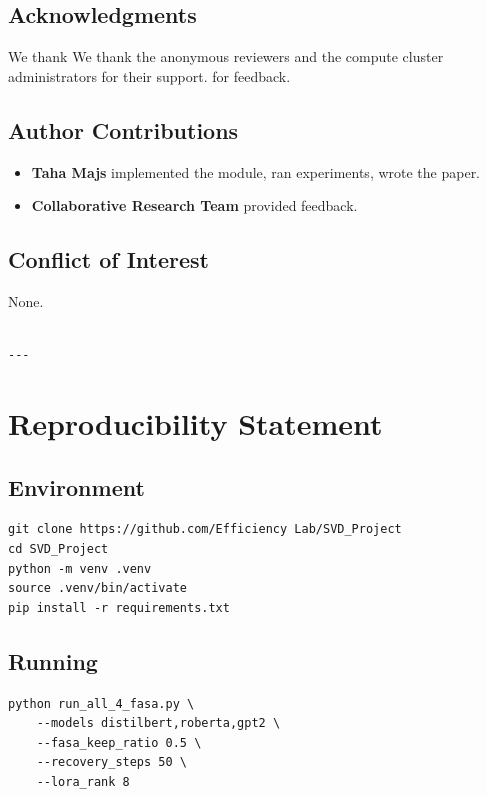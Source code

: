 \subsection{Acknowledgments}

We thank We thank the anonymous reviewers and the compute cluster administrators for their support. for feedback.

\subsection{Author Contributions}

\begin{itemize}
\item \textbf{Taha Majs} implemented the module, ran experiments, wrote the paper.
\item \textbf{Collaborative Research Team} provided feedback.

\end{itemize}
\subsection{Conflict of Interest}

None.
\begin{lstlisting}

---
\end{lstlisting}


\section{Reproducibility Statement}

\subsection{Environment}

\begin{lstlisting}
git clone https://github.com/Efficiency Lab/SVD_Project
cd SVD_Project
python -m venv .venv
source .venv/bin/activate
pip install -r requirements.txt
\end{lstlisting}

\subsection{Running}

\begin{lstlisting}
python run_all_4_fasa.py \
    --models distilbert,roberta,gpt2 \
    --fasa_keep_ratio 0.5 \
    --recovery_steps 50 \
    --lora_rank 8
\end{lstlisting}

